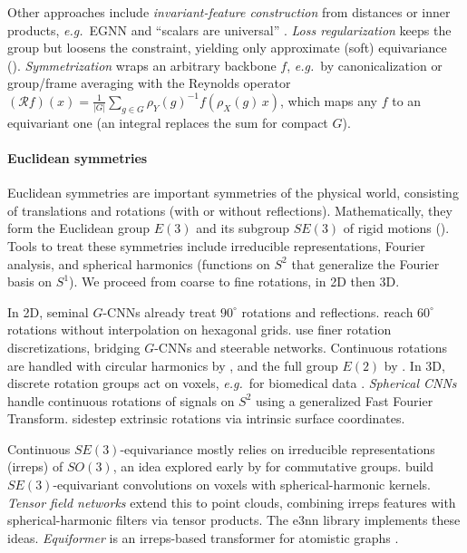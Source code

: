 \documentclass[mathematics,review,submit,moreauthors]{Definitions/mdpi}
\begin{document}
Other approaches include \emph{invariant-feature construction} from distances or inner products, \textit{e.g.}\ EGNN \citep{satorras2021p3icml} and ``scalars are universal'' \citep{villar2021anips}.
\emph{Loss regularization} keeps the group but loosens the constraint, yielding only approximate (soft) equivariance ().
\emph{Symmetrization} wraps an arbitrary backbone $f$, \textit{e.g.}\ by canonicalization \citep{kaba2023p4icml} or group/frame averaging \citep{puny2021} with the Reynolds operator $(\mathcal{R}f)(x)=\frac{1}{|G|}\sum_{g\in G}\rho_Y(g)^{-1}f(\rho_X(g)\,x)$, which maps any $f$ to an equivariant one (an integral replaces the sum for compact $G$).

\paragraph{Euclidean symmetries}
Euclidean symmetries are important symmetries of the physical world, consisting of translations and rotations (with or without reflections).
Mathematically, they form the Euclidean group $E(3)$ and its subgroup $SE(3)$ of rigid motions ().
Tools to treat these symmetries include irreducible representations, Fourier analysis, and spherical harmonics (functions on $S^2$ that generalize the Fourier basis on $S^1$).
We proceed from coarse to fine rotations, in 2D then 3D.

In 2D, seminal $G$-CNNs \citep{cohen2016} already treat $90^\circ$ rotations and reflections.
\citet{hoogeboom2018} reach $60^\circ$ rotations without interpolation on hexagonal grids.
\citet{weiler20182iccvpr} use finer rotation discretizations, bridging $G$-CNNs and steerable networks.
Continuous rotations are handled with circular harmonics by \citet{worrall2017}, and the full group $E(2)$ by \citet{weiler2019anips}.
In 3D, discrete rotation groups act on voxels, \textit{e.g.}\ for biomedical data \citep{worrall2018cv-e21ecmgs82ppv,winkels2019mia}.
\emph{Spherical CNNs} \citep{cohen2018} handle continuous rotations of signals on $S^2$ using a generalized Fast Fourier Transform.
\citet{monti20172iccvprc} sidestep extrinsic rotations via intrinsic surface coordinates.

Continuous $SE(3)$-equivariance mostly relies on irreducible representations (irreps) of $SO(3)$, an idea explored early by \citet{cohen2014} for commutative groups.
\citet{weiler2018anips} build $SE(3)$-equivariant convolutions on voxels with spherical-harmonic kernels.
\emph{Tensor field networks} \citep{thomas2018} extend this to point clouds, combining irreps features with spherical-harmonic filters via tensor products.
The e3nn library \citep{geiger2022} implements these ideas.
\emph{Equiformer} is an irreps-based transformer for atomistic graphs \citep{liao2022,liao2023}.
\end{document}
